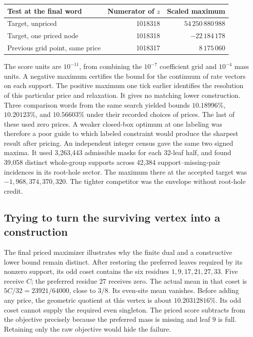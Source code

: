 \begin{center}
\begin{tabular}{@{}lrr@{}}
\toprule
Test at the final word & Numerator of \(z\) & Scaled maximum\\
\midrule
Target, unpriced  & 1018318 & \(54\,250\,880\,988\)\\
Target, one priced node & 1018318 & \(-22\,184\,178\)\\
Previous grid point, same price & 1018317 & \(8\,175\,060\)\\
\bottomrule
\end{tabular}
\end{center}
The score units are \(10^{-11}\), from combining the \(10^{-7}\) coefficient grid and \(10^{-4}\) mass units. A negative maximum certifies the bound for the continuum of rate vectors on each support. The positive maximum one tick earlier identifies the resolution of this particular price and relaxation. It gives no matching lower construction. Three comparison words from the same search yielded bounds \(10.18996\%\), \(10.20123\%\), and \(10.56603\%\) under their recorded choices of prices. The last of these used zero prices. A weaker closed-box optimum at one labeling was therefore a poor guide to which labeled constraint would produce the sharpest result after pricing. An independent integer census gave the same two signed maxima. It used 3,263,443 admissible masks for each 32-leaf half, and found 39,058 distinct whole-group supports across 42,384 support--missing-pair incidences in its root-hole sector. The maximum there at the accepted target was \(-1{,}968{,}374{,}370{,}320\). The tighter competitor was the envelope without root-hole credit.

\subsection{Trying to turn the surviving vertex into a construction}

The final priced maximizer illustrates why the finite dual and a constructive lower bound remain distinct. After restoring the preferred leaves required by its nonzero support, its odd coset contains the six residues \(1,9,17,21,27,33\). Five receive \(C\); the preferred residue \(27\) receives zero. The actual mean in that coset is \(5C/32=23921/64000\), close to \(3/8\). Its even-site mean vanishes. Before adding any price, the geometric quotient at this vertex is about \(10.20312816\%\). Its odd coset cannot supply the required even singleton. The priced score subtracts from the objective precisely because the preferred mass is missing and leaf \(9\) is full. Retaining only the raw objective would hide the failure.


